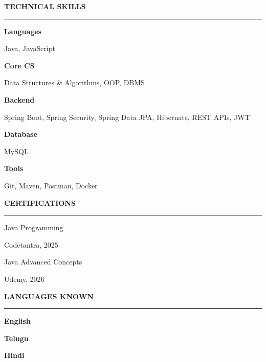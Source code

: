 \documentclass[a4paper]{article}
\newcommand{\sidehead}[1]{%
    {\color{navy}\bfseries\normalsize #1}\par
    \vspace{2pt}%
    {\color{navy}\rule{\linewidth}{0.65pt}}%
    \vspace{4pt}\par
}
\begin{document}
\begin{minipage}[t]{75mm}
\begin{minipage}[t]{60mm}
        \vspace{8pt}

        \sidehead{TECHNICAL SKILLS}

        \textbf{Languages}\par
        {\small Java, JavaScript}\par
        \vspace{3pt}

        \textbf{Core CS}\par
        {\small Data Structures \& Algorithms, OOP, DBMS}\par
        \vspace{3pt}

        \textbf{Backend}\par
        {\small Spring Boot, Spring Security, Spring Data JPA, Hibernate, REST APIs, JWT}\par
        \vspace{3pt}

        \textbf{Database}\par
        {\small MySQL}\par
        \vspace{3pt}

        \textbf{Tools}\par
        {\small Git, Maven, Postman, Docker}

        \vspace{8pt}

        \sidehead{CERTIFICATIONS}

        {\small Java Programming}\par
        {\footnotesize\color{muted} Codetantra, 2025}\par
        \vspace{3pt}
        {\small Java Advanced Concepts}\par
        {\footnotesize\color{muted} Udemy, 2026}\par

        \vspace{8pt}

        \sidehead{LANGUAGES KNOWN}

        \textbf{English}\;\par
        \vspace{2pt}
        \textbf{Telugu}\;\par
        \vspace{2pt}
        \textbf{Hindi}\;\par


\end{minipage}
\end{minipage}
\end{document}
